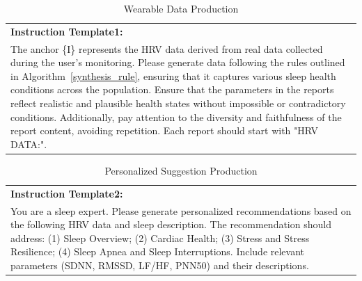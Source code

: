 \documentclass[preprint,12pt]{elsarticle}
\begin{document}
\begin{table}[ht]
\centering
\caption{Wearable Data Production}
\label{tab:template1}
\begin{tabular}{@{}p{}@{}}
\toprule
\textbf{Instruction Template1:} \\[2mm]
The anchor \{I\} represents the HRV data derived from real data collected during the user's monitoring. Please generate data following the rules outlined in Algorithm~\ref{synthesis_rule}, ensuring that it captures various sleep health conditions across the population. Ensure that the parameters in the reports reflect realistic and plausible health states without impossible or contradictory conditions. Additionally, pay attention to the diversity and faithfulness of the report content, avoiding repetition. Each report should start with "HRV DATA:".
\\[1mm]
\bottomrule
\end{tabular}
\end{table}

\begin{table}[ht]
\centering
\caption{Personalized Suggestion Production}
\label{tab:template2}
\begin{tabular}{@{}p{}@{}}
\toprule
\textbf{Instruction Template2:} \\[2mm]
You are a sleep expert. Please generate personalized recommendations based on the following HRV data and sleep description. The recommendation should address: (1) Sleep Overview; (2) Cardiac Health; (3) Stress and Stress Resilience; (4) Sleep Apnea and Sleep Interruptions. Include relevant parameters (SDNN, RMSSD, LF/HF, PNN50) and their descriptions.
\\[1mm]
\bottomrule
\end{tabular}
\end{table}
\end{document}
